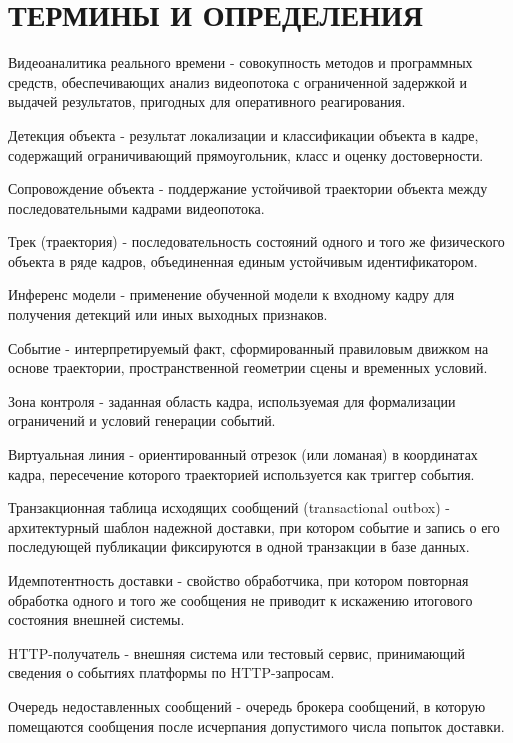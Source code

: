 \chapter*{ТЕРМИНЫ И ОПРЕДЕЛЕНИЯ}

Видеоаналитика реального времени - совокупность методов и программных средств, обеспечивающих анализ видеопотока с ограниченной задержкой и выдачей результатов, пригодных для оперативного реагирования.

Детекция объекта - результат локализации и классификации объекта в кадре, содержащий ограничивающий прямоугольник, класс и оценку достоверности.

Сопровождение объекта - поддержание устойчивой траектории объекта между последовательными кадрами видеопотока.

Трек (траектория) - последовательность состояний одного и того же физического объекта в ряде кадров, объединенная единым устойчивым идентификатором.

Инференс модели - применение обученной модели к входному кадру для получения детекций или иных выходных признаков.

Событие - интерпретируемый факт, сформированный правиловым движком на основе траектории, пространственной геометрии сцены и временных условий.

Зона контроля - заданная область кадра, используемая для формализации ограничений и условий генерации событий.

Виртуальная линия - ориентированный отрезок (или ломаная) в координатах кадра, пересечение которого траекторией используется как триггер события.

Транзакционная таблица исходящих сообщений (transactional outbox) - архитектурный шаблон надежной доставки, при котором событие и запись о его последующей публикации фиксируются в одной транзакции в базе данных.

Идемпотентность доставки - свойство обработчика, при котором повторная обработка одного и того же сообщения не приводит к искажению итогового состояния внешней системы.

HTTP-получатель - внешняя система или тестовый сервис, принимающий сведения о событиях платформы по HTTP-запросам.

Очередь недоставленных сообщений - очередь брокера сообщений, в которую помещаются сообщения после исчерпания допустимого числа попыток доставки.
